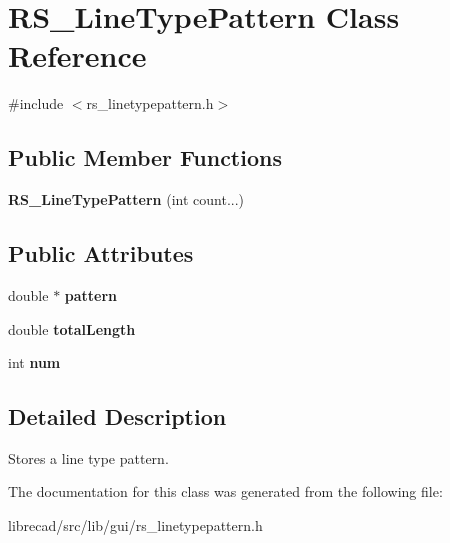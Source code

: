 \hypertarget{classRS__LineTypePattern}{\section{R\-S\-\_\-\-Line\-Type\-Pattern Class Reference}
\label{classRS__LineTypePattern}
}


{\ttfamily \#include $<$rs\-\_\-linetypepattern.\-h$>$}

\subsection*{Public Member Functions}
\begin{DoxyCompactItemize}
\item 
\hypertarget{classRS__LineTypePattern_a3f3f164eaaa87c3f17bdb00ad04cab47}{{\bfseries R\-S\-\_\-\-Line\-Type\-Pattern} (int count...)}\label{classRS__LineTypePattern_a3f3f164eaaa87c3f17bdb00ad04cab47}

\end{DoxyCompactItemize}
\subsection*{Public Attributes}
\begin{DoxyCompactItemize}
\item 
\hypertarget{classRS__LineTypePattern_a540d8bf26d5026aa71460c81bf50ae6e}{double $\ast$ {\bfseries pattern}}\label{classRS__LineTypePattern_a540d8bf26d5026aa71460c81bf50ae6e}

\item 
\hypertarget{classRS__LineTypePattern_acb6e83121ce151526f3711d06eeefcc0}{double {\bfseries total\-Length}}\label{classRS__LineTypePattern_acb6e83121ce151526f3711d06eeefcc0}

\item 
\hypertarget{classRS__LineTypePattern_ac2f8208c5e87c93f4cf721fa78d02f3c}{int {\bfseries num}}\label{classRS__LineTypePattern_ac2f8208c5e87c93f4cf721fa78d02f3c}

\end{DoxyCompactItemize}


\subsection{Detailed Description}
Stores a line type pattern. 

The documentation for this class was generated from the following file\-:\begin{DoxyCompactItemize}
\item 
librecad/src/lib/gui/rs\-\_\-linetypepattern.\-h\end{DoxyCompactItemize}
